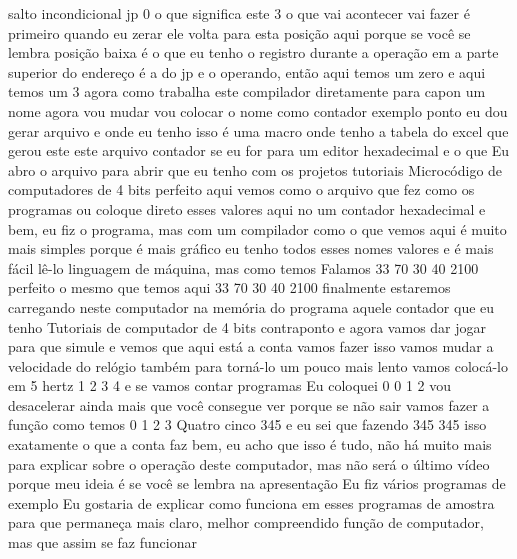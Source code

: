 \documentclass[oneside,11pt]{memoir} %
\begin{document}
salto  incondicional  jp  0  o que significa este 3 o que vai acontecer  vai fazer é primeiro  quando eu zerar ele volta para  esta posição aqui porque se você se lembra  posição baixa é o que eu tenho  o registro durante a operação em  a parte superior do endereço é a do  jp e o operando, então aqui temos um  zero e aqui temos um 3 agora como  trabalha este compilador diretamente para  capon um nome agora vou mudar  vou colocar o nome como contador  exemplo  ponto eu dou gerar arquivo e onde  eu tenho isso é uma macro  onde tenho a tabela do excel que gerou  este este arquivo contador  se eu for para um editor hexadecimal e o que  Eu abro o arquivo para abrir que eu tenho  com os projetos tutoriais  Microcódigo de computadores de 4 bits  perfeito aqui vemos como o  arquivo que fez como os programas ou  coloque direto esses valores aqui no  um contador hexadecimal  e bem, eu fiz o programa, mas com um  compilador como o que vemos aqui é  muito mais simples porque é mais gráfico  eu tenho todos esses nomes  valores e é mais fácil lê-lo  linguagem de máquina, mas como temos  Falamos 33 70 30 40 2100 perfeito  o mesmo que temos aqui 33 70 30 40  2100  finalmente estaremos carregando neste  computador na memória do programa  aquele contador que eu tenho  Tutoriais de computador de 4 bits  contraponto e agora vamos dar  jogar para que simule e vemos que aqui está  a conta vamos fazer isso vamos  mudar a velocidade do relógio também  para torná-lo um pouco mais lento  vamos colocá-lo em 5 hertz  1 2 3  4 e se vamos contar programas  Eu coloquei 0 0 1 2  vou desacelerar ainda mais  que você consegue ver porque se não sair  vamos fazer a função como temos 0 1 2 3  Quatro cinco  345 e eu sei que fazendo 345 345 isso  exatamente o que a conta faz  bem, eu acho que isso é tudo, não há muito  mais para explicar sobre o  operação deste computador, mas  não será o último vídeo porque meu  ideia é se você se lembra na apresentação  Eu fiz vários programas de exemplo  Eu gostaria de explicar como funciona em  esses programas de amostra para que permaneça  mais claro, melhor compreendido  função de computador, mas  que assim se faz funcionar

\end{document}
